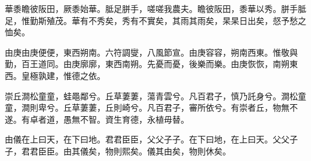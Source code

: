 \begin{pinyinscope}
華黍瞻彼阪田，厥黍始華。胝足胼手，嗟嗟我農夫。瞻彼阪田，黍華以秀。胼手胝足，惟勤斯殖茂。華有不秀矣，秀有不實矣，其雨其雨矣，杲杲日出矣，惄予愁之恤矣。

由庚由庚便便，東西朔南。六符調燮，八風節宣。由庚容容，朔南西東。惟敬與勤，百王道同。由庚廓廓，東西南朔。先憂而憂，後樂而樂。由庚恢恢，南朔東西。皇極孰建，惟德之依。

崇丘澗松童童，蛙黽鄰兮。丘草萋萋，蕩青雲兮。凡百君子，慎乃託身兮。澗松童童，澗則卑兮。丘草萋萋，丘則崎兮。凡百君子，審所依兮。有崇者丘，物無不遂。有卓者道，愚無不智。資生育德，永植毋替。

由儀在上曰天，在下曰地。君君臣臣，父父子子。在下曰地，在上曰天。父父子子，君君臣臣。由其儀矣，物則熙矣。儀其由矣，物則休矣。


\end{pinyinscope}